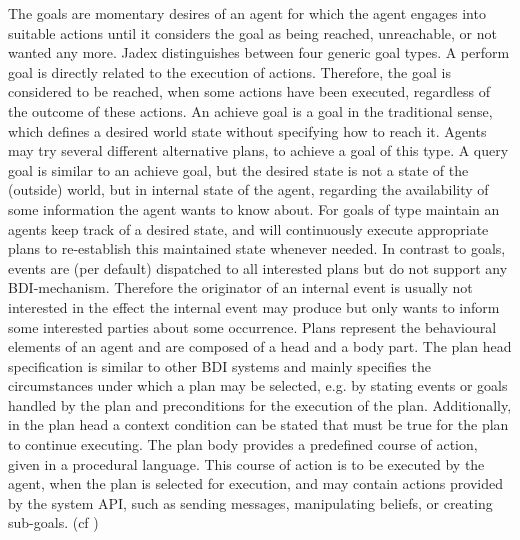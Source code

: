 The goals are momentary desires of an agent for which the agent engages into suitable actions until it considers the goal as being reached, unreachable, or not wanted any more. Jadex distinguishes between four generic goal types. A perform goal is directly related to the execution of actions. Therefore, the goal is considered to be reached, when some actions have been executed, regardless of the outcome of these actions. An achieve goal is a goal in the traditional sense, which defines a desired world state without specifying how to reach it. Agents may try several different alternative plans, to achieve a goal of this type. A query goal is similar to an achieve goal, but the desired state is not a state of the (outside) world, but in internal state of the agent, regarding the availability of some information the agent wants to know about. For goals of type maintain an agents keep track of a desired state, and will continuously execute appropriate plans to re-establish this maintained state whenever needed. In contrast to goals, events are (per default) dispatched to all interested plans but do not support any BDI-mechanism. Therefore the originator of an internal event is usually not interested in the effect the internal event may produce but only wants to inform some interested parties about some occurrence. Plans represent the behavioural elements of an agent and are composed of a head and a body part. The plan head specification is similar to other BDI systems and mainly specifies the circumstances under which a plan may be selected, e.g. by stating events or goals handled by the plan and preconditions for the execution of the plan. Additionally, in the plan head a context condition can be stated that must be true for the plan to continue executing. The plan body provides a predefined course of action, given in a procedural language. This course of action is to be executed by the agent, when the plan is selected for execution, and may contain actions provided by the system API, such as sending messages, manipulating beliefs, or creating sub-goals. (cf \cite{Pokahr2})

